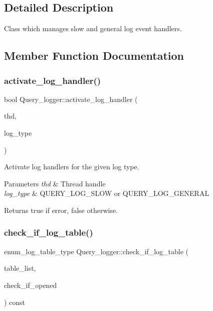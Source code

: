 \subsection{Detailed Description}
Class which manages slow and general log event handlers. 

\subsection{Member Function Documentation}
\mbox{\label{classQuery__logger_a5dcb287949aabb21bd0b0f4b6caab8c5}} 
\subsubsection{\texorpdfstring{activate\+\_\+log\+\_\+handler()}{activate\_log\_handler()}}
{\footnotesize\ttfamily bool Query\+\_\+logger\+::activate\+\_\+log\+\_\+handler (\begin{DoxyParamCaption}\item[{T\+HD $\ast$}]{thd,  }\item[{enum\+\_\+log\+\_\+table\+\_\+type}]{log\+\_\+type }\end{DoxyParamCaption})}

Activate log handlers for the given log type.


\begin{DoxyParams}{Parameters}
{\em thd} & Thread handle \\
\hline
{\em log\+\_\+type} & Q\+U\+E\+R\+Y\+\_\+\+L\+O\+G\+\_\+\+S\+L\+OW or Q\+U\+E\+R\+Y\+\_\+\+L\+O\+G\+\_\+\+G\+E\+N\+E\+R\+AL\\
\hline
\end{DoxyParams}
\begin{DoxyReturn}{Returns}
true if error, false otherwise. 
\end{DoxyReturn}
\mbox{\label{classQuery__logger_a08eb38503047a4778a376c38c8a227e3}} 
\subsubsection{\texorpdfstring{check\+\_\+if\+\_\+log\+\_\+table()}{check\_if\_log\_table()}}
{\footnotesize\ttfamily enum\+\_\+log\+\_\+table\+\_\+type Query\+\_\+logger\+::check\+\_\+if\+\_\+log\+\_\+table (\begin{DoxyParamCaption}\item[{\mbox{\hyperlink{structTABLE__LIST}{T\+A\+B\+L\+E\+\_\+\+L\+I\+ST}} $\ast$}]{table\+\_\+list,  }\item[{bool}]{check\+\_\+if\+\_\+opened }\end{DoxyParamCaption}) const}

